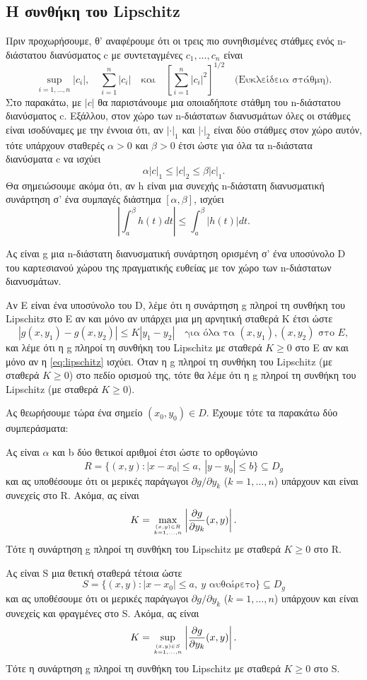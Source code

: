 \documentclass[11pt,a4paper,twoside]{book}
\newcommand{\eng}[1]{\selectlanguage{english}#1\selectlanguage{greek}}
\begin{document}
\subsection{Η συνθήκη του \eng{Lipschitz}}

Πριν προχωρήσουμε, θ' αναφέρουμε ότι οι τρεις πιο συνηθισμένες στάθμες ενός n-διάστατου διανύσματος c με συντεταγμένες $c_1, \dots, c_n$ είναι
\[
\sup_{i=1,\dots,n} |c_i|, \quad \sum_{i=1}^n |c_i| \quad \text{και} \quad \left[\sum_{i=1}^n |c_i|^2\right]^{1/2} \quad \text{(Ευκλείδεια στάθμη)}.
\]
Στο παρακάτω, με $|c|$ θα παριστάνουμε μια οποιαδήποτε στάθμη του n-διάστατου διανύσματος c. Εξάλλου, στον χώρο των n-διάστατων διανυσμάτων όλες οι στάθμες είναι ισοδύναμες με την έννοια ότι, αν $|\cdot|_1$ και $|\cdot|_2$ είναι δύο στάθμες στον χώρο αυτόν, τότε υπάρχουν σταθερές $\alpha>0$ και $\beta>0$ έτσι ώστε για όλα τα n-διάστατα διανύσματα c να ισχύει
\[
\alpha |c|_1 \le |c|_2 \le \beta |c|_1.
\]
Θα σημειώσουμε ακόμα ότι, αν h είναι μια συνεχής n-διάστατη διανυσματική συνάρτηση σ' ένα συμπαγές διάστημα $[\alpha, \beta]$, ισχύει
\[
\left|\int_a^\beta h(t)dt\right| \le \int_a^\beta |h(t)|dt.
\]

Ας είναι g μια n-διάστατη διανυσματική συνάρτηση ορισμένη σ' ένα υποσύνολο D του καρτεσιανού χώρου της πραγματικής ευθείας με τον χώρο των n-διάστατων διανυσμάτων.

Αν Ε είναι ένα υποσύνολο του D, λέμε ότι η συνάρτηση g πληροί τη συνθήκη του Lipschitz στο Ε αν και μόνο αν υπάρχει μια μη αρνητική σταθερά Κ έτσι ώστε
\begin{equation} \label{eq:lipschitz}
|g(x,y_1)-g(x,y_2)| \le K|y_1-y_2| \quad \text{για όλα τα } (x,y_1), (x,y_2) \text{ στο } E, \tag{*}
\end{equation}
και λέμε ότι η g πληροί τη συνθήκη του Lipschitz με σταθερά $K \ge 0$ στο Ε αν και μόνο αν η \eqref{eq:lipschitz} ισχύει. Όταν η g πληροί τη συνθήκη του Lipschitz (με σταθερά $K \ge 0$) στο πεδίο ορισμού της, τότε θα λέμε ότι η g πληροί τη συνθήκη του Lipschitz (με σταθερά $K \ge 0$).

Ας θεωρήσουμε τώρα ένα σημείο $(x_0,y_0) \in D$. Έχουμε τότε τα παρακάτω δύο συμπεράσματα:
\begin{rlist}
\item Ας είναι $\alpha$ και b δύο θετικοί αριθμοί έτσι ώστε
το ορθογώνιο
\[
R = \{ (x,y) : |x-x_0| \le a, \ |y-y_0| \le b \} \subseteq D_g
\]
και ας υποθέσουμε ότι οι μερικές παράγωγοι $\partial g / \partial y_k$ ($k=1,\dots,n$) υπάρχουν και είναι συνεχείς στο R. Ακόμα, ας είναι
\[
K = \max_{(x,y) \in R \atop k=1,\dots,n} \left| \frac{\partial g}{\partial y_k}(x,y) \right|.
\]
Τότε η συνάρτηση g πληροί τη συνθήκη του Lipschitz με σταθερά $K \ge 0$ στο R.

\item Ας είναι S μια θετική σταθερά τέτοια ώστε
\[
S = \{ (x,y) : |x-x_0| \le a, \ y \text{ αυθαίρετο} \} \subseteq D_g
\]
και ας υποθέσουμε ότι οι μερικές παράγωγοι $\partial g / \partial y_k$ ($k=1,\dots,n$) υπάρχουν και είναι συνεχείς και φραγμένες στο S. Ακόμα, ας είναι
\[
K = \sup_{(x,y) \in S \atop k=1,\dots,n} \left| \frac{\partial g}{\partial y_k}(x,y) \right|.
\]
Τότε η συνάρτηση g πληροί τη συνθήκη του Lipschitz με σταθερά $K \ge 0$ στο S.
\end{rlist}
\end{document}

